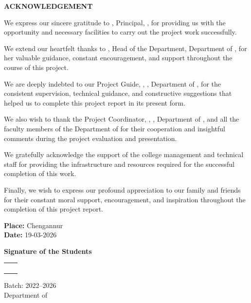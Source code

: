 \begin{center}
	\Large\textbf{ACKNOWLEDGEMENT}
\end{center}

We express our sincere gratitude to \theprincipal, Principal, \thecollege, for providing us with the opportunity and necessary facilities to carry out the project work successfully.

We extend our heartfelt thanks to \thehod, Head of the Department, Department of \thedepartment, for her valuable guidance, constant encouragement, and support throughout the course of this project.

We are deeply indebted to our Project Guide, \theprojectguide, \projectguidedesignation, Department of \thedepartment, for the consistent supervision, technical guidance, and constructive suggestions that helped us to complete this project report in its present form.

We also wish to thank the Project Coordinator, \theProjectcoordinator, \ProjectcoordinatorDesignation, Department of \thedepartment, and all the faculty members of the Department of \thedepartment for their cooperation and insightful comments during the project evaluation and presentation.

We gratefully acknowledge the support of the college management and technical staff for providing the infrastructure and resources required for the successful completion of this work.

Finally, we wish to express our profound appreciation to our family and friends for their constant moral support, encouragement, and inspiration throughout the completion of this project report.

\textbf{Place:} Chengannur\\
\textbf{Date:} 19-03-2026\\
\vspace{0.1cm}

\textbf{Signature of the Students}

\begin{tabular}{p{6cm} p{4cm}}
	\textbf{\studentA} & \regA \\
	\textbf{\studentB} & \regB \\
	\textbf{\studentC} & \regC \\
	\textbf{\studentD} & \regD \\
\end{tabular}
\vspace{0.1cm}

Batch: 2022--2026\\
Department of \thedepartment\\
\thecollege
\clearpage